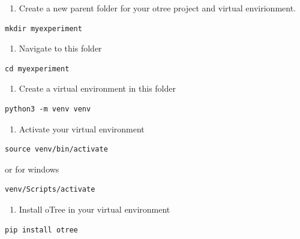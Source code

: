 \documentclass[
  letterpaper,
  DIV=11,
  numbers=noendperiod]{scrreprt}
\providecommand{\tightlist}{%
  \setlength{\itemsep}{0pt}\setlength{\parskip}{0pt}}\usepackage{longtable,booktabs,array}
\begin{document}
\begin{enumerate}
\def\labelenumi{\arabic{enumi}.}
\tightlist
\item
  Create a new parent folder for your otree project and virtual
  envirionment.
\end{enumerate}

\begin{verbatim}
mkdir myexperiment
\end{verbatim}

\begin{enumerate}
\def\labelenumi{\arabic{enumi}.}
\setcounter{enumi}{1}
\tightlist
\item
  Navigate to this folder
\end{enumerate}

\begin{verbatim}
cd myexperiment
\end{verbatim}

\begin{enumerate}
\def\labelenumi{\arabic{enumi}.}
\setcounter{enumi}{2}
\tightlist
\item
  Create a virtual environment in this folder
\end{enumerate}

\begin{verbatim}
python3 -m venv venv
\end{verbatim}

\begin{enumerate}
\def\labelenumi{\arabic{enumi}.}
\setcounter{enumi}{3}
\tightlist
\item
  Activate your virtual environment
\end{enumerate}

\begin{verbatim}
source venv/bin/activate
\end{verbatim}

or for windows

\begin{verbatim}
venv/Scripts/activate
\end{verbatim}

\begin{enumerate}
\def\labelenumi{\arabic{enumi}.}
\setcounter{enumi}{4}
\tightlist
\item
  Install oTree in your virtual environment
\end{enumerate}

\begin{verbatim}
pip install otree
\end{verbatim}
\end{document}
